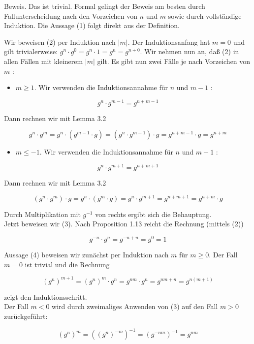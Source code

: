 \documentclass[10pt, letterpaper]{article}
\begin{document}
Beweis. Das ist trivial. Formal gelingt der Beweis am besten durch Fallunterscheidung nach den Vorzeichen von $n$ und $m$ sowie durch vollständige Induktion. Die Aussage (1) folgt direkt aus der Definition.

Wir beweisen (2) per Induktion nach $|m|$. Der Induktionsanfang hat $m=0$ und gilt trivialerweise: $g^{n} \cdot g^{0}=g^{n} \cdot 1=g^{n}=g^{n+0}$. Wir nehmen nun an, daß (2) in allen Fällen mit kleinerem $|m|$ gilt. Es gibt nun zwei Fälle je nach Vorzeichen von $m$ :

\begin{itemize}
  \item $m \geq 1$. Wir verwenden die Induktionsannahme für $n$ und $m-1$ :
\end{itemize}

$$
g^{n} \cdot g^{m-1}=g^{n+m-1}
$$

Dann rechnen wir mit Lemma 3.2

$$
g^{n} \cdot g^{m}=g^{n} \cdot\left(g^{m-1} \cdot g\right)=\left(g^{n} \cdot g^{m-1}\right) \cdot g=g^{n+m-1} \cdot g=g^{n+m}
$$

\begin{itemize}
  \item $m \leq-1$. Wir verwenden die Induktionsannahme für $n$ und $m+1$ :
\end{itemize}

$$
g^{n} \cdot g^{m+1}=g^{n+m+1}
$$

Dann rechnen wir mit Lemma 3.2

$$
\left(g^{n} \cdot g^{m}\right) \cdot g=g^{n} \cdot\left(g^{m} \cdot g\right)=g^{n} \cdot g^{m+1}=g^{n+m+1}=g^{n+m} \cdot g
$$

Durch Multiplikation mit $g^{-1}$ von rechts ergibt sich die Behauptung.\\
Jetzt beweisen wir (3). Nach Proposition 1.13 reicht die Rechnung (mittels (2))

$$
g^{-n} \cdot g^{n}=g^{-n+n}=g^{0}=1
$$

Aussage (4) beweisen wir zunächst per Induktion nach $m$ für $m \geq 0$. Der Fall $m=0$ ist trivial und die Rechnung

$$
\left(g^{n}\right)^{m+1}=\left(g^{n}\right)^{m} \cdot g^{n}=g^{n m} \cdot g^{n}=g^{n m+n}=g^{n(m+1)}
$$

zeigt den Induktionsschritt.\\
Der Fall $m<0$ wird durch zweimaliges Anwenden von (3) auf den Fall $m>0$ zurückgeführt:

$$
\left(g^{n}\right)^{m}=\left(\left(g^{n}\right)^{-m}\right)^{-1}=\left(g^{-n m}\right)^{-1}=g^{n m}
$$
\end{document}
